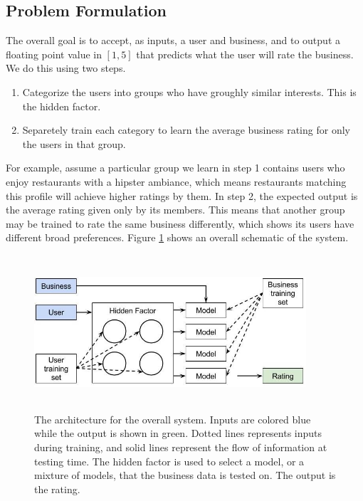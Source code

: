 \documentclass[11pt]{article}
\begin{document}
\subsection{Problem Formulation}
The overall goal is to accept, as inputs, a user and business, and to output a floating point value in $[1, 5]$ that predicts what the user will rate the business. We do this using two steps.

\begin{enumerate}
\item Categorize the users into groups who have groughly similar interests. This is the hidden factor.
\item Separetely train each category to learn the average business rating for only the users in that group.
\end{enumerate}

For example, assume a particular group we learn in step 1 contains users who enjoy restaurants with a hipster ambiance, which means restaurants matching this profile will achieve higher ratings by them. In step 2, the expected output is the average rating given only by its members. This means that another group may be trained to rate the same business differently, which shows its users have different broad preferences. Figure \ref{fig:system} shows an overall schematic of the system.\\

\begin{figure}[h!]
    \centering
    \includegraphics[width=0.9\textwidth, height=5.75cm]{architecture}
    \caption{The architecture for the overall system. Inputs are colored blue while the output is shown in green. Dotted lines represents inputs during training, and solid lines represent the flow of information at testing time. The hidden factor is used to select a model, or a mixture of models, that the business data is tested on. The output is the rating.}
    \label{fig:system}
\end{figure} 
\end{document}

